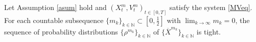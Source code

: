 \documentclass{ims9x6}
\newcommand{\OX}{\overline{X}}
\begin{document}

\begin{theorem}\label{thmtight1}
	Let Assumption \ref{asum} hold and $(X_t^m,V_t^m)_{t\in[0,T]}$ satisfy the system \eqref{MVeq}. For each countable subsequence $\{m_k\}_{k\in\mathbb N} \subset [0,\frac{1}{2}]$ with $\lim_{k\rightarrow \infty}m_k=0$, the sequence of probability distributions $\{\rho^{m_k}\}_{k\in\mathbb N}$ of $\{\OX^{m_k}\}_{k\in\mathbb N}$  is tight.
\end{theorem}
\end{document}
